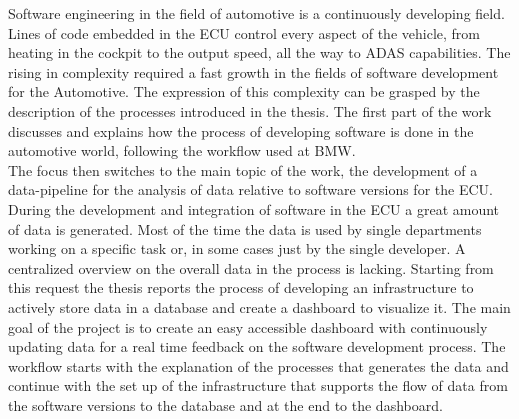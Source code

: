 \documentclass[../main.tex]{subfiles}
\begin{document}
Software engineering in the field of automotive is a continuously developing field. Lines of code embedded in the \gls{ECU} control every aspect of the vehicle, from heating in the cockpit to the output speed, all the way to \gls{ADAS} capabilities. The rising in complexity required a fast growth in the fields of software development for the Automotive. The expression of this complexity can be grasped by the description of the processes introduced in the thesis. The first part of the work discusses and explains how the process of developing software is done in the automotive world, following the workflow used at \gls{BMW}.\\
The focus then switches to the main topic of the work, the development of a data-pipeline for the analysis of data relative to software versions for the \gls{ECU}. During the development and integration of software in the \gls{ECU} a great amount of data is generated. Most of the time the data is used by single departments working on a specific task or, in some cases just by the single developer. A centralized overview on the overall data in the process is lacking. Starting from this request the thesis reports the process of developing an infrastructure to actively store data in a database and create a dashboard to visualize it. The main goal of the project is to create an easy accessible dashboard with continuously updating data for a real time feedback on the software development process. The workflow starts with the explanation of the processes that generates the data and continue with the set up of the infrastructure that supports the flow of data from the software versions to the database and at the end to the dashboard.\\
\cleardoublepage
\end{document}
